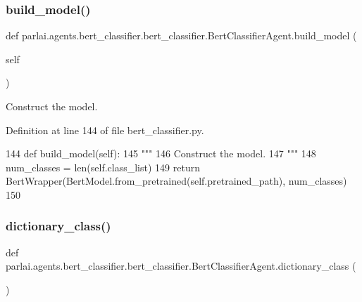 \subsubsection{\texorpdfstring{build\+\_\+model()}{build\_model()}}
{\footnotesize\ttfamily def parlai.\+agents.\+bert\+\_\+classifier.\+bert\+\_\+classifier.\+Bert\+Classifier\+Agent.\+build\+\_\+model (\begin{DoxyParamCaption}\item[{}]{self }\end{DoxyParamCaption})}

\begin{DoxyVerb}Construct the model.
\end{DoxyVerb}
 

Definition at line 144 of file bert\+\_\+classifier.\+py.


\begin{DoxyCode}
144     \textcolor{keyword}{def }build\_model(self):
145         \textcolor{stringliteral}{"""}
146 \textcolor{stringliteral}{        Construct the model.}
147 \textcolor{stringliteral}{        """}
148         num\_classes = len(self.class\_list)
149         \textcolor{keywordflow}{return} BertWrapper(BertModel.from\_pretrained(self.pretrained\_path), num\_classes)
150 
\end{DoxyCode}
\mbox{\label{classparlai_1_1agents_1_1bert__classifier_1_1bert__classifier_1_1BertClassifierAgent_af568b5ebe0ada0e2823e9e2be2d70e9f}} 
\subsubsection{\texorpdfstring{dictionary\+\_\+class()}{dictionary\_class()}}
{\footnotesize\ttfamily def parlai.\+agents.\+bert\+\_\+classifier.\+bert\+\_\+classifier.\+Bert\+Classifier\+Agent.\+dictionary\+\_\+class (\begin{DoxyParamCaption}{ }\end{DoxyParamCaption})\hspace{0.3cm}{\ttfamily [static]}}

